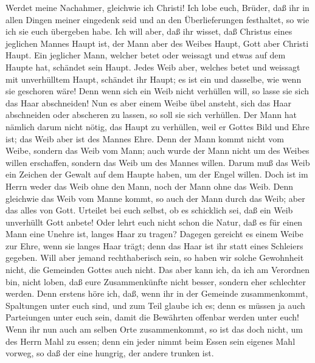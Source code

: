  Werdet meine Nachahmer, gleichwie ich Christi!
 Ich lobe euch, Brüder, daß ihr in allen Dingen meiner
eingedenk seid und an den Überlieferungen festhaltet, so wie ich sie
euch übergeben habe.  Ich will aber, daß ihr wisset, daß
Christus eines jeglichen Mannes Haupt ist, der Mann aber des Weibes
Haupt, Gott aber Christi Haupt.  Ein jeglicher Mann,
welcher betet oder weissagt und etwas auf dem Haupte hat, schändet sein
Haupt.  Jedes Weib aber, welches betet und weissagt mit
unverhülltem Haupt, schändet ihr Haupt; es ist ein und dasselbe, wie
wenn sie geschoren wäre!  Denn wenn sich ein Weib nicht
verhüllen will, so lasse sie sich das Haar abschneiden! Nun es aber
einem Weibe übel ansteht, sich das Haar abschneiden oder abscheren zu
lassen, so soll sie sich verhüllen.  Der Mann hat nämlich
darum nicht nötig, das Haupt zu verhüllen, weil er Gottes Bild und Ehre
ist; das Weib aber ist des Mannes Ehre.  Denn der Mann
kommt nicht vom Weibe, sondern das Weib vom Mann;  auch
wurde der Mann nicht um des Weibes willen erschaffen, sondern das Weib
um des Mannes willen.  Darum muß das Weib ein Zeichen der
Gewalt auf dem Haupte haben, um der Engel willen.  Doch
ist im Herrn weder das Weib ohne den Mann, noch der Mann ohne das Weib.
 Denn gleichwie das Weib vom Manne kommt, so auch der
Mann durch das Weib; aber das alles von Gott.  Urteilet
bei euch selbst, ob es schicklich sei, daß ein Weib unverhüllt Gott
anbete!  Oder lehrt euch nicht schon die Natur, daß es
für einen Mann eine Unehre ist, langes Haar zu tragen? 
Dagegen gereicht es einem Weibe zur Ehre, wenn sie langes Haar trägt;
denn das Haar ist ihr statt eines Schleiers gegeben. 
Will aber jemand rechthaberisch sein, so haben wir solche Gewohnheit
nicht, die Gemeinden Gottes auch nicht.  Das aber kann
ich, da ich am Verordnen bin, nicht loben, daß eure Zusammenkünfte nicht
besser, sondern eher schlechter werden.  Denn erstens
höre ich, daß, wenn ihr in der Gemeinde zusammenkommt, Spaltungen unter
euch sind, und zum Teil glaube ich es;  denn es müssen ja
auch Parteiungen unter euch sein, damit die Bewährten offenbar werden
unter euch!  Wenn ihr nun auch am selben Orte
zusammenkommt, so ist das doch nicht, um des Herrn Mahl zu essen;
 denn ein jeder nimmt beim Essen sein eigenes Mahl
vorweg, so daß der eine hungrig, der andere trunken ist. 
